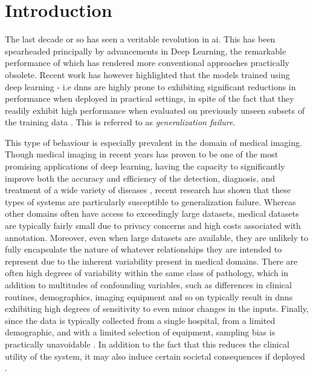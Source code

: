     \chapter{Introduction}\label{introduction}

    The last decade or so has seen a veritable revolution in \gls{ai}. This has been spearheaded principally by advancements in Deep Learning, the remarkable performance of which has rendered more conventional approaches practically obsolete. Recent work has however highlighted that the models trained using deep learning - i.e \glspl{dnn} are highly prone to exhibiting significant reductions in performance when deployed in practical settings, in spite of the fact that they readily exhibit high performance when evaluated on previously unseen subsets of the training data \cite{damour2020underspecification, shortcut_learning, noise_robustness, corruption_robustness}. This is referred to as \textit{generalization failure}. 
    
    This type of behaviour is especially prevalent in the domain of medical imaging. Though medical imaging in recent years has proven to be one of the most promising applications of deep learning, having the capacity to significantly improve both the accuracy and efficiency of the detection, diagnosis, and treatment of a wide variety of diseases \cite{dl_medical_imaging}, recent research has shown that these types of systems are particularly susceptible to generalization failure. Whereas other domains often have access to exceedingly large datasets, medical datasets are typically fairly small due to privacy concerns and high costs associated with annotation. Moreover, even when large datasets are available, they are unlikely to fully encapsulate the nature of whatever relationships they are intended to represent due to the inherent variability present in medical domains. There are often high degrees of variability within the same class of pathology, which in addition to multitudes of confounding variables, such as differences in clinical routines, demographics, imaging equipment and so on typically result in \glspl{dnn} exhibiting high degrees of sensitivity to even minor changes in the inputs. Finally, since the data is typically collected from a single hospital, from a limited demographic, and with a limited selection of equipment, sampling bias is practically unavoidable \cite{bias, bias2}. In addition to the fact that this reduces the clinical utility of the system, it may also induce certain societal consequences if deployed \cite{social_consequence_1}. 
    

